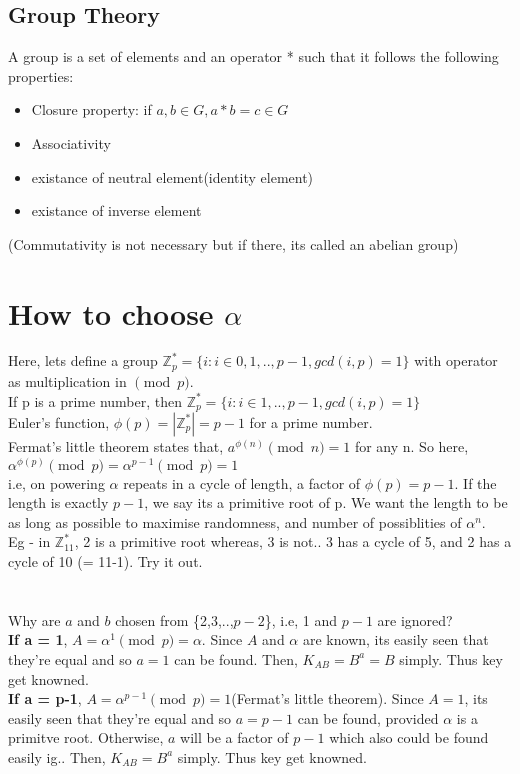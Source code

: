 \documentclass[english, 11pt]{article}
\begin{document}
\subsection*{Group Theory}
A group is a set of elements and an operator * such that it follows the following properties:
\begin{itemize}
  \item Closure property: if $a,b \in G, a * b = c \in G$
  \item Associativity
  \item existance of neutral element(identity element)
  \item existance of inverse element
\end{itemize}
(Commutativity is not necessary but if there, its called an abelian group)

\section*{How to choose $\alpha$}
Here, lets define a group $\mathbb{Z}^{*}_{p} = \{i: i \in {0,1,..,p-1}, gcd(i,p) = 1\}$ with operator as multiplication in $\pmod{p}$.\\
If p is a prime number, then $\mathbb{Z}^{*}_{p} = \{i: i \in {1,..,p-1}, gcd(i,p) = 1\}$ \\
Euler's function, $\phi(p) = |\mathbb{Z}^{*}_{p}| = p-1$ for a prime number. \\
Fermat's little theorem states that, $a^{\phi(n)} \pmod{n} = 1$ for any n. So here,
$\alpha^{\phi(p)} \pmod{p} = \alpha^{p-1} \pmod{p} = 1$ \\
i.e, on powering $\alpha$ repeats in a cycle of length, a factor of $\phi(p) = p-1$.
If the length is exactly $p-1$, we say its a primitive root of p.
We want the length to be as long as possible to maximise randomness, and number of possiblities of $\alpha^n$.\\
Eg - in $\mathbb{Z}^{*}_{11}$, 2 is a primitive root whereas, 3 is not.. 3 has a cycle of 5, and 2 has a cycle of 10 (= 11-1). Try it out.
\\ \\ \\
Why are $a$ and $b$ chosen from \{2,3,..,$p-2$\}, i.e, 1 and $p-1$ are ignored?\\
\textbf{If a = 1}, $A = \alpha^1 \pmod{p} = \alpha$. Since $A$ and $\alpha$ are known, its easily seen that they're equal and so $a=1$ can be found. Then, $K_{AB} = B^a = B$ simply. Thus key get knowned.\\
\textbf{If a = p-1}, $A = \alpha^{p-1} \pmod{p} = 1$(Fermat's little theorem). Since $A=1$, its easily seen that they're equal and so $a=p-1$ can be found, provided $\alpha$ is a primitve root. Otherwise, $a$ will be a factor of $p-1$ which also could be found easily ig.. Then, $K_{AB} = B^a$ simply. Thus key get knowned.\\
\end{document}
